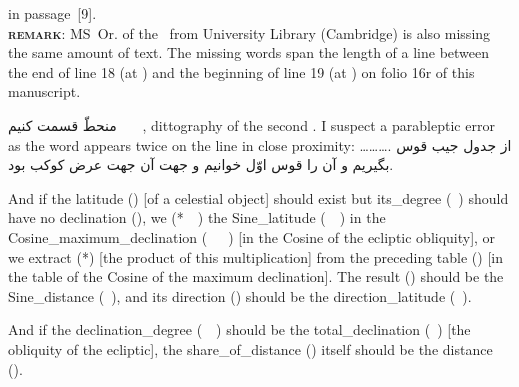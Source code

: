 {{\begin{itemize}
 in  passage~[9].\\[5pt]
\textbf{\scshape remark}: MS~Or. of the \ZijUlughBeg\ from  University Library (Cambridge) is also missing the same amount of text. The missing words  span the length of a line between the end of line 18 (at ) %
and the beginning of line 19 (at ) on folio 16r of this manuscript.\label{zij_ulugh_beg_missing_line}
\end{itemize}\vspace{-\topsep}
} %
منحطّ قسمت کنیم %
%
{~\te{$\Big ]$}~~\SjB, dittography of the second . %
I suspect a parableptic error as the word  %
appears twice on the line in close proximity: 
\dots\thinspace {}\thinspace\dots\thinspace{}\thinspace\dots\thinspace.\label{wrap_footnote_example}}
از جدول جيب قوس بگیریم و آن را قوس اوّل خوانیم  و جهت آن جهت عرض کوکب بود.\hfill}

\clearpage{}

\noindent\reversemarginpar{}%
And if the \gls{latitude} (\ard) [of a celestial object] should exist but \gls{its_degree} (\daraji\idafavowel\ \uy)  should have no \gls{declination}  (\mayl), we   (*\munhatt\idafaconsonant\ \darb\ \kardan) the \gls{Sine_latitude} (\jayb\idafaconsonant\ \ard\idafaconsonant\ \uy) in the \gls{Cosine_maximum_declination} (\jayb\idafaconsonant\ \tamam\idafaconsonant\ \mayl\idafaconsonant\ \kulli)  [\ie  in the Cosine of the ecliptic obliquity], or we \gls{extract} (*\darardan) [the product of this multiplication] from the preceding \gls{table} (\jadval) [\ie in the table of the Cosine of the maximum declination]. The \gls{result} (\hasil) should be the \gls{Sine_distance} (\jayb\idafaconsonant\ \bud), and its \gls{direction} (\jahat) should be the \gls{direction_latitude} (\jahat\idafaconsonant\ \ard).\label{passge_6_ard_glossary_format_example}
\medskip

\noindent\reversemarginpar{}%
And if the \gls{declination_degree} (\mayl\idafaconsonant\ \daraji\idafavowel\ \uy) should be the \gls{total_declination} (\mayl\idafaconsonant\ \kulli) [\ie the obliquity of the ecliptic], the \gls{share_of_distance} (\hissatalbud) itself should be the \gls{distance} (\bud). 
\\[\baselineskip]

